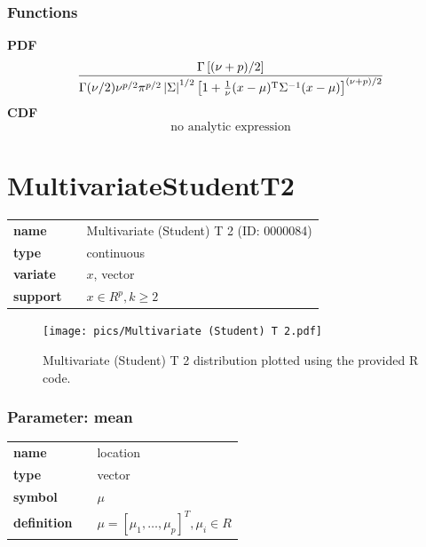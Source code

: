 \documentclass{article}
\begin{document}
\subsubsection*{Functions}

\smallskip \noindent \hspace{.2cm} \textbf{PDF} 
\begin{equation*}\frac{\Gamma\left[(\nu+p)/2\right]}{\Gamma(\nu/2)\nu^{p/2}\pi^{p/2}\left|\Sigma\right|^{1/2}\left[1+\frac{1}{\nu}(x-\mu)^{\rm T}\Sigma^{-1}(x-\mu)\right]^{(\nu+p)/2}}\end{equation*}
\smallskip \noindent \hspace{.2cm} \textbf{CDF} 
\begin{equation*}\text{no analytic expression}\end{equation*}
\smallskip\section*{MultivariateStudentT2} 

  \bigskip 

\begin{tabular}{p{2cm}cl}
\textbf{name} & & Multivariate (Student) T 2 (ID: 0000084)\\ 
 
\textbf{type} & & continuous \\ 

\textbf{variate} & & $x$, vector \\ 

\textbf{support} & & $x \in R^p, k\geq 2$
\end{tabular}

\begin{figure}[ht!]
\centering
  \texttt{[image: pics/Multivariate (Student) T 2.pdf]}
 \caption{Multivariate (Student) T 2 distribution plotted using the provided R code.}
 \label{fig:Multivariate (Student) T 2}
\end{figure}

\subsubsection*{Parameter: mean}

\noindent\begin{tabular}{p{2cm}cl}
\textbf{name} & & location \\
\textbf{type} & & vector \\
\textbf{symbol} & & $\mu$  \\
\textbf{definition} & & $\mu = [\mu_1, \dots, \mu_p]^T, \mu_i \in R$
\end{tabular}
\end{document}
